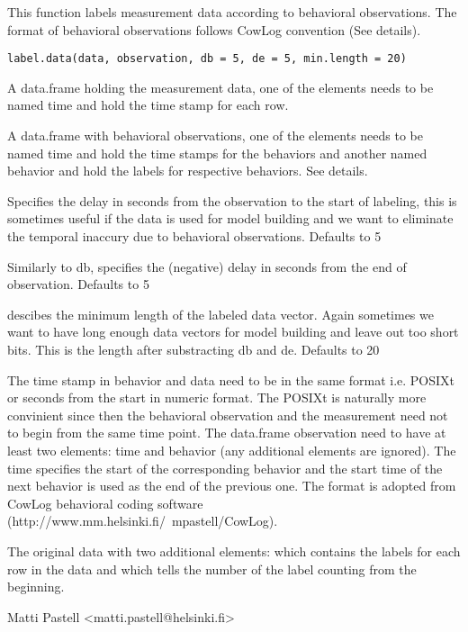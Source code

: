 \begin{Description}\relax
This function labels measurement data according to behavioral
observations. The format of behavioral observations follows CowLog
convention (See details).
\end{Description}
\begin{Usage}
\begin{verbatim}
label.data(data, observation, db = 5, de = 5, min.length = 20)
\end{verbatim}
\end{Usage}
\begin{Arguments}
\begin{ldescription}
\item[\code{data}] A data.frame holding the measurement data, one of the
elements needs to be named time and hold the time stamp for each row.
\item[\code{observation}] A data.frame with behavioral observations, one of
the elements needs to be named time and hold the time stamps for the
behaviors and another named behavior and hold the labels for
respective behaviors. See details.
\item[\code{db}] Specifies the delay in seconds from the observation to the start of
labeling, this is sometimes useful if the data is used for model
building and we want to eliminate the temporal inaccury due to
behavioral observations. Defaults to 5
\item[\code{de}] Similarly to db, specifies the (negative) delay in seconds
from the end of observation. Defaults to 5
\item[\code{min.length}] descibes the minimum length of
the labeled data vector. Again sometimes we want to have long enough
data vectors for model building and leave out too short bits. This is
the length after substracting db and de. Defaults to 20
\end{ldescription}
\end{Arguments}
\begin{Details}\relax
The time stamp in behavior and data need to be in the same format i.e. POSIXt or seconds from the start in numeric
format. The POSIXt is naturally more convinient since then the
behavioral observation and the measurement need not to begin from the
same time point.
The data.frame observation need to have at least two elements: time and
behavior (any additional elements are ignored). The time specifies the
start of the corresponding behavior and the start time of the next
behavior is used as the end of the previous one.
The format is adopted from CowLog behavioral coding software
(http://www.mm.helsinki.fi/~mpastell/CowLog).
\end{Details}
\begin{Value}
The original data with two additional elements:  which contains
the labels for each row in the data and  which tells the number of
the label counting from the beginning.
\end{Value}
\begin{Author}\relax
Matti Pastell <matti.pastell@helsinki.fi>
\end{Author}


